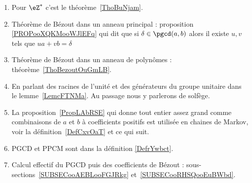  \label{THEMEooNRZHooYuuHyt}
\begin{enumerate}
	\item
	      Pour \( \eZ^*\) c'est le théorème~\ref{ThoBuNjam}.
	\item
	      Théorème de Bézout dans un anneau principal : proposition \ref{PROPooXQKMooWJlEFq} qui dit que si \( \delta\in \pgcd(a,b) \) alors il existe \( u,v\) tels que \( ua+vb=\delta\)
	\item
	      Théorème de Bézout dans un anneau de polynômes : théorème~\ref{ThoBezoutOuGmLB}.
	\item
	      En parlant des racines de l'unité et des générateurs du groupe unitaire dans le lemme~\ref{LemcFTNMa}. Au passage nous y parlerons de solfège.
	\item
	      La proposition~\ref{PropLAbRSE} qui donne tout entier assez grand comme combinaisons de \( a \) et \( b\) à coefficients positifs est utilisée en chaines de Markov, voir la définition~\ref{DefCxvOaT} et ce qui suit.
	\item
	      PGCD et PPCM sont dans la définition \ref{DefrYwbct}.
	\item
	      Calcul effectif du PGCD puis des coefficients de Bézout : sous-sections~\ref{SUBSECooAEBLooFGJRkg} et~\ref{SUBSECooRHSQooEuBWbd}.
\end{enumerate}
